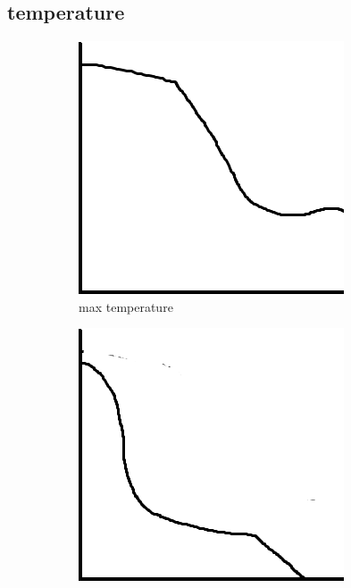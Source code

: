 \subsection{temperature} 
\begin{figure}[hbt!] 
\begin{subfigure}{0.3\textwidth} 
\includegraphics[width=0.9\linewidth]{reports/current_report/images/max_graph_temperature.png}  
\caption{max temperature}  
\end{subfigure} 
\begin{subfigure}{0.3\textwidth} 
\includegraphics[width=0.9\linewidth]{reports/current_report/images/min_graph_temperature.png}  

\end{subfigure}
\end{figure}
